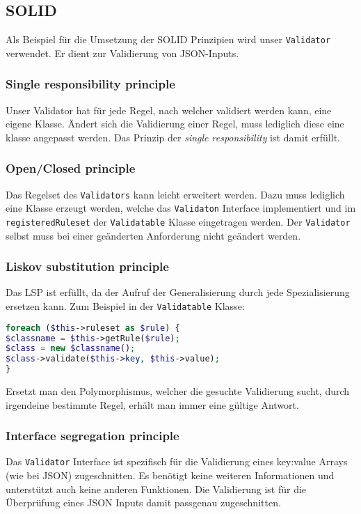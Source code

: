 \documentclass[12pt,a4paper,titlepage,ngerman,pdftex]{report}
\begin{document}
    \subsection{SOLID}
    \label{subsec:solid}
    Als Beispiel für die Umsetzung der SOLID Prinzipien wird unser \verb|Validator| verwendet. Er dient zur Validierung von JSON-Inputs.
    
    \subsubsection{Single responsibility principle}
    Unser Validator hat für jede Regel, nach welcher validiert werden kann, eine eigene Klasse. Ändert sich die Validierung einer Regel, muss lediglich diese eine klasse angepasst werden. Das Prinzip der \textit{single responsibility} ist damit erfüllt.
    \subsubsection{Open/Closed principle}
    Das Regelset des \verb|Validators| kann leicht erweitert werden. Dazu muss lediglich eine Klasse erzeugt werden, welche das \verb|Validaton| Interface implementiert und im \verb|registeredRuleset| der \verb|Validatable| Klasse eingetragen werden. Der \verb|Validator| selbst muss bei einer geänderten Anforderung nicht geändert werden.
    \subsubsection{Liskov substitution principle}
    Das LSP ist erfüllt, da der Aufruf der Generalisierung durch jede Spezialisierung ersetzen kann. Zum Beispiel in der \verb|Validatable| Klasse:
    \begin{lstlisting}[language=php,label={lst:lsp},escapechar=\%]
foreach ($this->ruleset as $rule) {
$classname = $this->getRule($rule);
$class = new $classname();
$class->validate($this->key, $this->value);
}
    \end{lstlisting}
	Ersetzt man den Polymorphismus, welcher die gesuchte Validierung sucht, durch irgendeine bestimmte Regel, erhält man immer eine gültige Antwort.
    \subsubsection{Interface segregation principle}
    Das \verb|Validator| Interface ist spezifisch für die Validierung eines key:value Arrays (wie bei JSON) zugeschnitten. Es benötigt keine weiteren Informationen und unterstützt auch keine anderen Funktionen. Die Validierung ist für die Überprüfung eines JSON Inputs damit passgenau zugeschnitten. 
\end{document}

